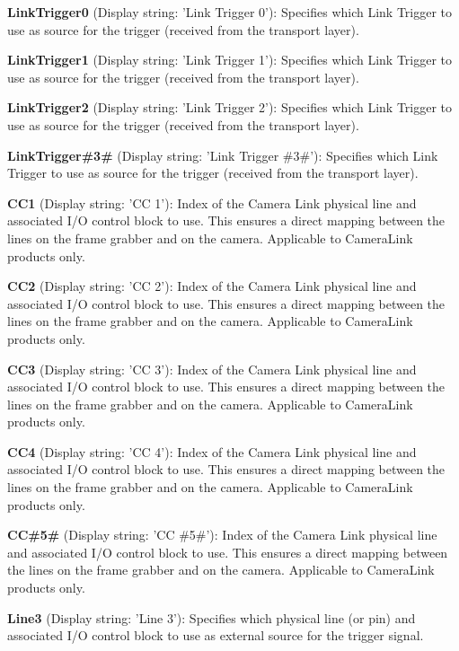 \begin{DoxyItemize}
\item {\bfseries Link\+Trigger0} (Display string\+: 'Link Trigger 0')\+: Specifies which Link Trigger to use as source for the trigger (received from the transport layer).
\item {\bfseries Link\+Trigger1} (Display string\+: 'Link Trigger 1')\+: Specifies which Link Trigger to use as source for the trigger (received from the transport layer).
\item {\bfseries Link\+Trigger2} (Display string\+: 'Link Trigger 2')\+: Specifies which Link Trigger to use as source for the trigger (received from the transport layer).
\item {\bfseries Link\+Trigger\#3\#} (Display string\+: 'Link Trigger \#3\#')\+: Specifies which Link Trigger to use as source for the trigger (received from the transport layer).
\item {\bfseries C\+C1} (Display string\+: 'C\+C 1')\+: Index of the Camera Link physical line and associated I/\+O control block to use. This ensures a direct mapping between the lines on the frame grabber and on the camera. Applicable to Camera\+Link products only.
\item {\bfseries C\+C2} (Display string\+: 'C\+C 2')\+: Index of the Camera Link physical line and associated I/\+O control block to use. This ensures a direct mapping between the lines on the frame grabber and on the camera. Applicable to Camera\+Link products only.
\item {\bfseries C\+C3} (Display string\+: 'C\+C 3')\+: Index of the Camera Link physical line and associated I/\+O control block to use. This ensures a direct mapping between the lines on the frame grabber and on the camera. Applicable to Camera\+Link products only.
\item {\bfseries C\+C4} (Display string\+: 'C\+C 4')\+: Index of the Camera Link physical line and associated I/\+O control block to use. This ensures a direct mapping between the lines on the frame grabber and on the camera. Applicable to Camera\+Link products only.
\item {\bfseries C\+C\#5\#} (Display string\+: 'C\+C \#5\#')\+: Index of the Camera Link physical line and associated I/\+O control block to use. This ensures a direct mapping between the lines on the frame grabber and on the camera. Applicable to Camera\+Link products only.
\item {\bfseries Line3} (Display string\+: 'Line 3')\+: Specifies which physical line (or pin) and associated I/\+O control block to use as external source for the trigger signal.

\end{DoxyItemize}
